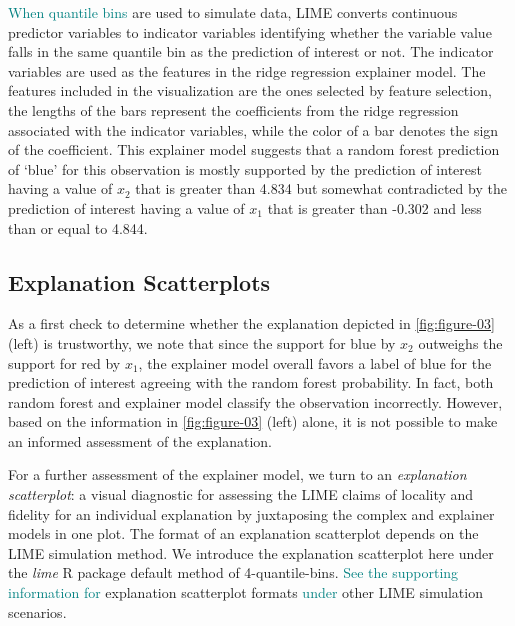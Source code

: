 \documentclass[AMS,STIX2COL]{WileyNJD-v2}\usepackage[]{graphicx}\usepackage[]{color}
\newcommand{\hh}[1]{\textcolor{orange}{#1}}
\newcommand{\kgc}[1]{\textcolor{purple}{#1}}
\newcommand{\kge}[1]{\textcolor{teal}{#1}}
\renewcommand{\sout}[1]{\unskip}
\begin{document}
\sout{Since 4-quantile-bins} \kge{When quantile bins} are used to simulate data, LIME converts continuous predictor variables to indicator variables identifying whether the variable value falls in the same quantile bin as the prediction of interest or not. The indicator variables are used as the features in the ridge regression explainer model. The features included in the visualization are the ones selected by feature selection, the lengths of the bars represent the coefficients from the ridge regression associated with the indicator variables, while the color of a bar denotes the sign of the coefficient. This explainer model suggests that a random forest prediction of `blue' for this observation is mostly supported by the prediction of interest having a value of $x_2$ that is greater than 4.834 but somewhat contradicted by the prediction of interest having a value of $x_1$ that is greater than -0.302 and less than or equal to 4.844. %

\subsection{Explanation Scatterplots} \label{exp-scatter}

As a first check to determine whether the explanation depicted in \autoref{fig:figure-03} (left) is trustworthy, we note that since the support for blue by $x_2$ outweighs the support for red by $x_1$, the explainer model overall favors a label of blue for the prediction of interest agreeing with the random forest probability. In fact, both random forest and explainer model classify the observation incorrectly. However, based on the information in \autoref{fig:figure-03} (left) alone, it is not possible to make an informed assessment of the explanation. 

For a further assessment of the explainer model, we turn to an \emph{explanation scatterplot}: a visual diagnostic for assessing the LIME claims of locality and fidelity for an individual explanation by juxtaposing the complex and explainer models in one plot. The format of an explanation scatterplot depends on the LIME simulation method. We introduce the explanation scatterplot here under the \emph{lime} R package default method of 4-quantile-bins. \kge{See the supporting information for} \sout{Appendix \ref{exp-scatter_plus} addresses the} explanation scatterplot formats \kge{under} \sout{in} other LIME simulation scenarios.
\end{document}
